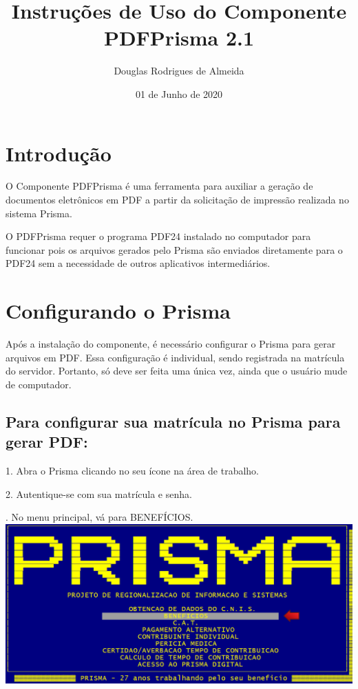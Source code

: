 \documentclass[12pt,a4paper]{article}
\title{Instruções de Uso do Componente PDFPrisma 2.1}
\author{Douglas Rodrigues de Almeida}
\date{01 de Junho de 2020}
\begin{document}
\maketitle

\section{Introdução}
O Componente PDFPrisma é uma ferramenta para auxiliar a geração de documentos eletrônicos em PDF a partir da solicitação de impressão realizada no sistema Prisma.

O PDFPrisma requer o programa PDF24 instalado no computador para funcionar pois os arquivos gerados pelo Prisma são enviados diretamente para o PDF24 sem a necessidade de outros aplicativos intermediários.

\section{Configurando o Prisma}
Após a instalação do componente, é necessário configurar o Prisma para gerar arquivos em PDF. Essa configuração é individual, sendo registrada na matrícula do servidor. Portanto, só deve ser feita uma única vez, ainda que o usuário mude de computador.

\subsection{Para configurar sua matrícula no Prisma para gerar PDF:}
1. Abra o Prisma clicando no seu ícone na área de trabalho.

2. Autentique-se com sua matrícula e senha.

. No menu principal, vá para BENEFÍCIOS.\\
\includegraphics[width=1.0\textwidth, center]{menu}\\
\end{document}
